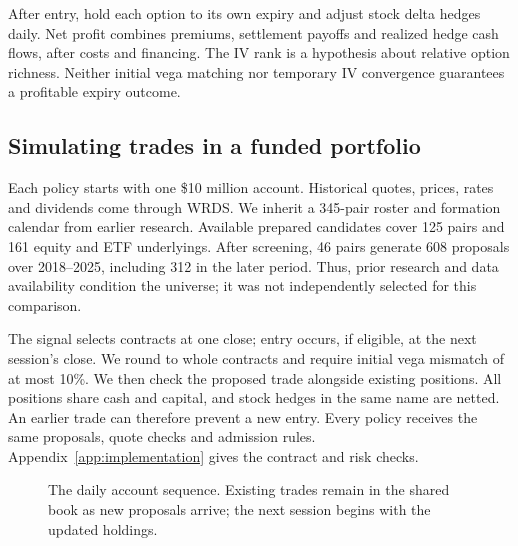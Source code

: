 \documentclass[11pt,letterpaper]{article}
\newcommand{\money}[1]{\$#1}
\begin{document}
After entry, hold each option to its own expiry and adjust stock delta hedges
daily. Net profit combines premiums, settlement payoffs and realized hedge
cash flows, after costs and financing. The IV rank is a hypothesis about
relative option richness. Neither initial vega matching nor temporary IV
convergence guarantees a profitable expiry outcome.

\clearpage
\subsection{Simulating trades in a funded portfolio}
\label{sec:execution}
Each policy starts with one \money{10 million} account. Historical quotes,
prices, rates and dividends come through WRDS. We inherit a 345-pair roster
and formation calendar from earlier research. Available prepared candidates
cover 125 pairs and 161 equity and ETF underlyings. After screening, 46 pairs
generate 608 proposals over 2018--2025, including 312 in the later period.
Thus, prior research and data availability condition the universe; it was not
independently selected for this comparison.

The signal selects contracts at one close; entry occurs, if eligible, at the
next session's close. We round to whole contracts and require initial vega
mismatch of at most 10\%. We then check the proposed trade alongside existing
positions. All positions share cash and capital, and stock hedges in the same
name are netted. An earlier trade can therefore prevent a new entry. Every
policy receives the same proposals, quote checks and admission rules.
Appendix~\ref{app:implementation} gives the contract and risk checks.

\begin{figure}[H]
\centering
{}
\caption{The daily account sequence. Existing trades remain in the shared
book as new proposals arrive; the next session begins with the updated holdings.}
\label{fig:daily-account}
\end{figure}
\end{document}
